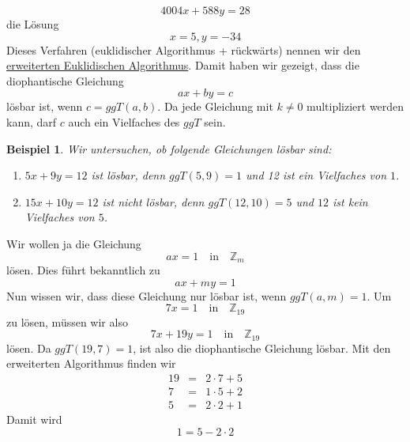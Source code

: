 \documentclass{report}
\newtheorem{myexample}{Beispiel}
\begin{document}
\begin{equation}4004x + 588y = 28\end{equation}
die Lösung
\begin{equation}x = 5, y = -34\end{equation}
Dieses Verfahren (euklidischer Algorithmus + rückwärts) nennen wir den 
\\\underline{erweiterten Euklidischen Algorithmus}. Damit haben wir gezeigt, dass die diophantische Gleichung
\begin{equation}ax + by = c\end{equation}
lösbar ist, wenn $c = ggT(a, b)$. Da jede Gleichung mit $k \neq 0$ multipliziert werden kann, darf $c$ auch ein Vielfaches des $ggT$ sein.
\begin{myexample}Wir untersuchen, ob folgende Gleichungen lösbar sind:\begin{enumerate}
\item $5x + 9y = 12$ ist lösbar, denn $ggT(5, 9) = 1$ und 12 ist ein Vielfaches von $1$.
\item $15x + 10y = 12$ ist nicht lösbar, denn $ggT(12, 10) = 5$ und $12$ ist kein Vielfaches von $5$.
\end{enumerate}\end{myexample}
Wir wollen ja die Gleichung
\begin{equation}ax = 1 \quad \mbox{in} \quad \mathbb{Z}_m \end{equation}
lösen. Dies führt bekanntlich zu
\begin{equation}ax + my = 1\end{equation}
Nun wissen wir, dass diese Gleichung nur lösbar ist, wenn $ggT(a, m) = 1$. Um
\begin{equation}7x = 1 \quad \mbox{in} \quad \mathbb{Z}_{19} \end{equation}
zu lösen, müssen wir also
\begin{equation}7x + 19y = 1 \quad \mbox{in} \quad \mathbb{Z}_{19} \end{equation}
lösen. Da $ggT(19, 7) = 1$, ist also die diophantische Gleichung lösbar. Mit den erweiterten Algorithmus finden wir
\begin{eqnarray}19 & = & 2 \cdot 7 + 5 \label{eqn:diophant-3}\\
7 & = & 1 \cdot 5 + 2 \label{eqn:diophant-1}\\
5 & = & 2 \cdot 2 + 1\end{eqnarray}
Damit wird
\begin{equation}1 = 5 - 2 \cdot 2 \label{eqn:diophant-2}\end{equation}
\end{document}
